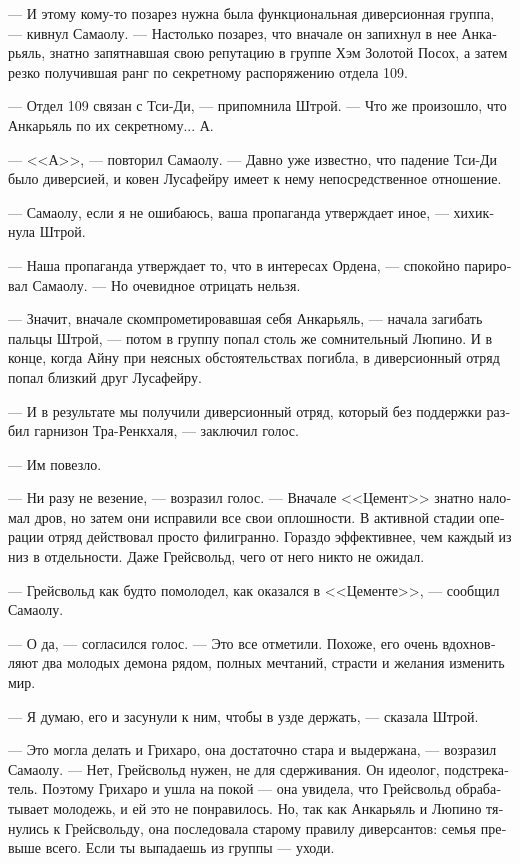 \documentclass[a4paper,12pt,fleqn]{book}\usepackage{polyglossia}\setdefaultlanguage[babelshorthands=true]{russian}\setotherlanguage{english}\defaultfontfeatures{Ligatures=TeX,Mapping=tex-text}\usepackage{xcolor}\newcommand{\ml}[3]{#2}
\begin{document}
{--- И этому кому-то позарез нужна была функциональная диверсионная группа, --- кивнул Самаолу.
--- Настолько позарез, что вначале он запихнул в нее Анкарьяль, знатно запятнавшая свою репутацию в группе Хэм Золотой Посох, а затем резко получившая ранг по секретному распоряжению отдела 109.

--- Отдел 109 связан с Тси-Ди, --- припомнила Штрой.
--- Что же произошло, что Анкарьяль по их секретному...
А.

--- <<А>>, --- повторил Самаолу.
--- Давно уже известно, что падение Тси-Ди было диверсией, и ковен Лусафейру имеет к нему непосредственное отношение.

--- Самаолу, если я не ошибаюсь, ваша пропаганда утверждает иное, --- хихикнула Штрой.

--- Наша пропаганда утверждает то, что в интересах Ордена, --- спокойно парировал Самаолу.
--- Но очевидное отрицать нельзя.

--- Значит, вначале скомпрометировавшая себя Анкарьяль, --- начала загибать пальцы Штрой, --- потом в группу попал столь же сомнительный Люпино.
И в конце, когда Айну при неясных обстоятельствах погибла, в диверсионный отряд попал близкий друг Лусафейру.

--- И в результате мы получили диверсионный отряд, который без поддержки разбил гарнизон Тра-Ренкхаля, --- заключил голос.

--- Им повезло.

--- Ни разу не везение, --- возразил голос.
--- Вначале <<Цемент>> знатно наломал дров, но затем они исправили все свои оплошности.
В активной стадии операции отряд действовал просто филигранно.
Гораздо эффективнее, чем каждый из низ в отдельности.
Даже Грейсвольд, чего от него никто не ожидал.

--- Грейсвольд как будто помолодел, как оказался в <<Цементе>>, --- сообщил Самаолу.

--- О да, --- согласился голос.
--- Это все отметили.
Похоже, его очень вдохновляют два молодых демона рядом, полных мечтаний, страсти и желания изменить мир.

--- Я думаю, его и засунули к ним, чтобы в узде держать, --- сказала Штрой.

--- Это могла делать и Грихаро, она достаточно стара и выдержана, --- возразил Самаолу.
--- Нет, Грейсвольд нужен, не для сдерживания. 
Он идеолог, подстрекатель.
Поэтому Грихаро и ушла на покой --- она увидела, что Грейсвольд обрабатывает молодежь, и ей это не понравилось.
Но, так как Анкарьяль и Люпино тянулись к Грейсвольду, она последовала старому правилу диверсантов: семья превыше всего.
Если ты выпадаешь из группы --- уходи.

}
\end{document}
